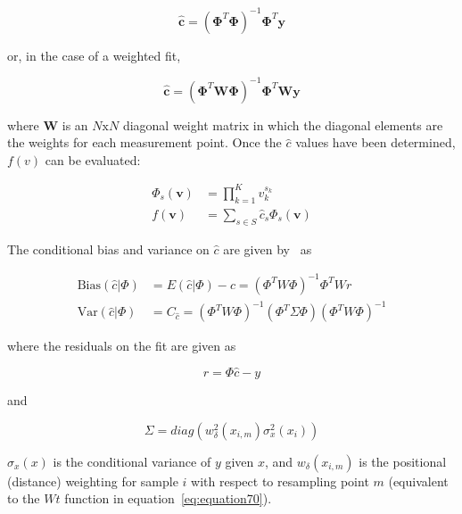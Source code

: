 \begin{equation}
    \mathbf{\hat{c}} = (\mathbf{\Phi}^T\mathbf{\Phi})^{-1}
                       \mathbf{\Phi}^T \mathbf{y}
    \label{eq:equation9}
\end{equation}

or, in the case of a weighted fit,

\begin{equation}
    \mathbf{\hat{c}} = (\mathbf{\Phi}^T \mathbf{W} \mathbf{\Phi})^{-1}
                       \mathbf{\Phi}^T \mathbf{W} \mathbf{y}
    \label{eq:equation10}
\end{equation}

where $\mathbf{W}$ is an $N \textrm{x} N$ diagonal weight matrix in which the
diagonal elements are the weights for each measurement point.
Once the $\hat{c}$ values have been determined,  $f(v)$ can be evaluated:

\begin{align}
    \Phi_s(\bm{v}) &= \prod_{k=1}^K v_k^{s_k} \\
    f(\bm{v}) &= \sum_{s \in S} \hat{c}_s \Phi_s(\bm{v})
\end{align}

The conditional bias and variance on $\hat{c}$ are given by~\citet{Fan96b} as

\begin{align}
    \text{Bias}(\hat{c} | \Phi) &= E(\hat{c} | \Phi) - c =
        (\Phi^T W \Phi)^{-1} \Phi^T W r \label{eq:equation71} \\
    \text{Var}(\hat{c} | \Phi) &= C_{\hat{c}} =
        (\Phi^T W \Phi)^{-1} (\Phi^T \Sigma \Phi) (\Phi^T W \Phi)^{-1}
        \label{eq:equation72}
\end{align}

where the residuals on the fit are given as

\begin{equation}
    r = \Phi \hat{c} - y
    \label{eq:equation73}
\end{equation}

and

\begin{equation}
    \Sigma = {diag}({w_\delta^2}(x_{i,m}) \sigma_x^2(x_i))
    \label{eq:equation74}
\end{equation}

$\sigma_x(x)$ is the conditional variance of $y$ given $x$, and
${w_\delta}(x_{i,m})$ is the positional (distance) weighting for sample
$i$ with respect to resampling point $m$ (equivalent to the $Wt$ function in
equation~\ref{eq:equation70}).


